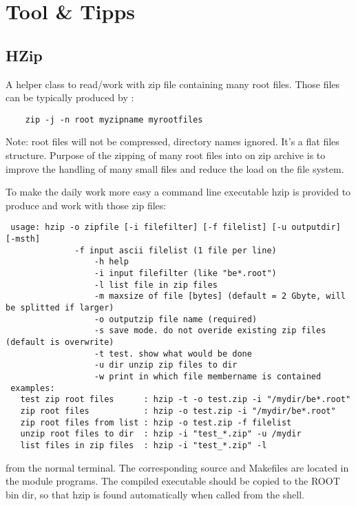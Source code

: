 \chapter{Tool \& Tipps}\label{Chapter_tools_and_tipps}


\section{HZip}

A helper class to read/work with zip file containing
 many root files. Those files can be typically produced
 by :
\begin{lstlisting}
    zip -j -n root myzipname myrootfiles
\end{lstlisting}

Note: root files will not be compressed, directory names
ignored. It's a flat files structure. Purpose of the
zipping of many root files into on zip archive is
to improve the handling of many small files and reduce
the load on the file system.


To make the daily work more easy a command line executable hzip
is provided to produce and work with those zip files:

\begin{lstlisting}
 usage: hzip -o zipfile [-i filefilter] [-f filelist] [-u outputdir] [-msth]
	          -f input ascii filelist (1 file per line)
                  -h help
                  -i input filefilter (like "be*.root")
                  -l list file in zip files
                  -m maxsize of file [bytes] (default = 2 Gbyte, will be splitted if larger)
                  -o outputzip file name (required)
                  -s save mode. do not overide existing zip files (default is overwrite)
                  -t test. show what would be done
                  -u dir unzip zip files to dir
                  -w print in which file membername is contained
 examples:
   test zip root files      : hzip -t -o test.zip -i "/mydir/be*.root"
   zip root files           : hzip -o test.zip -i "/mydir/be*.root"
   zip root files from list : hzip -o test.zip -f filelist
   unzip root files to dir  : hzip -i "test_*.zip" -u /mydir
   list files in zip files  : hzip -i "test_*.zip" -l
\end{lstlisting}
 
from the normal terminal. The corresponding source and Makefiles
are located in the module programs. The compiled executable should
be copied to the ROOT bin dir, so that hzip is found automatically
when called from the shell.

